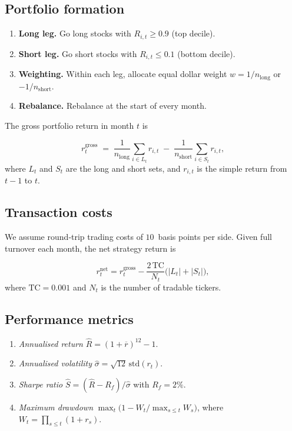 \documentclass[11pt]{article}
\begin{document}
\subsection{Portfolio formation}

\begin{enumerate}[label=(\alph*)]
  \item \textbf{Long leg.}   Go long stocks with \(R_{i,t}\ge 0.9\) (top decile).
  \item \textbf{Short leg.}  Go short stocks with \(R_{i,t}\le 0.1\) (bottom decile).
  \item \textbf{Weighting.}  Within each leg, allocate equal dollar weight \(w = 1/n_{\text{long}}\) or \(-1/n_{\text{short}}\).
  \item \textbf{Rebalance.}  Rebalance at the start of every month.
\end{enumerate}

The gross portfolio return in month \(t\) is

\[
r^{\text{gross}}_{t} \;=\; \frac{1}{n_{\text{long}}}\!\sum_{i\in L_t}\! r_{i,t}
\;-\;
\frac{1}{n_{\text{short}}}\!\sum_{i\in S_t}\! r_{i,t},
\]
where \(L_t\) and \(S_t\) are the long and short sets, and \(r_{i,t}\) is the simple return from \(t-1\) to \(t\).

\subsection{Transaction costs}

We assume round‑trip trading costs of \(10\)~basis points per side.  
Given full turnover each month, the net strategy return is

\[
r^{\text{net}}_t
= r^{\text{gross}}_t
- \frac{2\,\text{TC}}{N_t}\bigl(|L_t| + |S_t|\bigr),
\]
where \(\text{TC}=0.001\) and \(N_t\) is the number of tradable tickers.

\subsection{Performance metrics}

\begin{enumerate}[label=(\alph*)]
  \item \emph{Annualised return} \(\hat{R} = (1+\overline{r})^{12}-1\).
  \item \emph{Annualised volatility} \(\hat{\sigma} = \sqrt{12}\,\mathrm{std}(r_t)\).
  \item \emph{Sharpe ratio} \( \hat{S} = (\hat{R}-R_f)/\hat{\sigma}\) with \(R_f=2\%\).
  \item \emph{Maximum drawdown} \(\max_t \bigl(1 - W_t / \max_{s\le t} W_s\bigr)\), where \(W_t = \prod_{s\le t}(1+r_s)\).
\end{enumerate}
\end{document}
